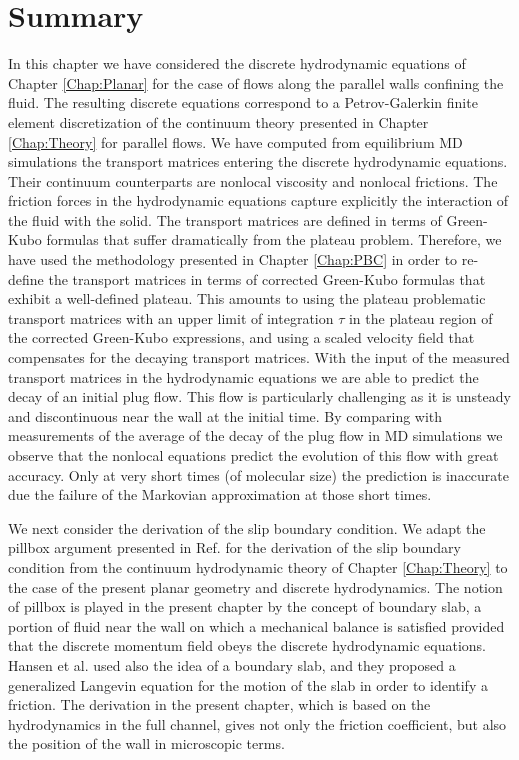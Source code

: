 \documentclass[b5paper,openright,10pt]{book}
\begin{document}
\section{Summary}

In this chapter  we have  considered the  discrete hydrodynamic
equations of  Chapter \ref{Chap:Planar} for  the case of  flows along the  parallel walls
confining the fluid. The resulting  discrete equations correspond to a
Petrov-Galerkin finite element discretization  of the continuum theory
presented in Chapter \ref{Chap:Theory} for  parallel flows.  We have computed
from equilibrium  MD simulations  the transport matrices  entering the
discrete  hydrodynamic equations.   Their  continuum counterparts  are
nonlocal viscosity  and nonlocal frictions.  The  friction forces in
the hydrodynamic  equations capture explicitly the  interaction of the
fluid with the solid.  The transport  matrices are defined in terms of
Green-Kubo formulas that suffer dramatically from the plateau problem.
Therefore, we have used the methodology presented in Chapter \ref{Chap:PBC} in
order  to  re-define the  transport  matrices  in terms  of  corrected
Green-Kubo  formulas  that  exhibit   a  well-defined  plateau.   This
amounts to using  the plateau problematic transport  matrices with an
upper  limit  of integration  $\tau$  in  the  plateau region  of  the
corrected Green-Kubo  expressions, and  using a scaled  velocity field
that compensates for the decaying  transport matrices.  With the input
of the  measured transport matrices  in the hydrodynamic  equations we
are able to predict  the decay of an initial plug  flow.  This flow is
particularly challenging as  it is unsteady and discontinuous near the  wall at the
initial time.   By comparing with  measurements of the average  of the
decay of the plug flow in MD simulations we observe that the nonlocal
equations predict the evolution of this flow with great accuracy. Only
at very short  times (of molecular size) the  prediction is inaccurate
due the failure of the Markovian approximation at those short times.

We next  consider the  derivation of the  slip boundary  condition. We
adapt  the  pillbox  argument  presented in  Ref.   \cite{CamargoBC2018}  for  the
derivation  of   the  slip  boundary  condition   from  the  continuum
hydrodynamic theory of Chapter \ref{Chap:Theory} to the case  of the present
planar geometry and  discrete hydrodynamics. The notion  of pillbox is
played in the present chapter by  the concept of boundary slab, a portion
of fluid  near the  wall on  which a  mechanical balance  is satisfied
provided  that   the  discrete  momentum  field   obeys  the  discrete
hydrodynamic equations. Hansen et  al. \cite{Hansen2011} used also the
idea  of a  boundary slab,  and they  proposed a  generalized Langevin
equation  for  the  motion  of  the   slab  in  order  to  identify  a
friction. The derivation  in the present chapter, which is  based on the
hydrodynamics  in  the  full  channel, gives  not  only  the  friction
coefficient, but also the position of the wall in microscopic terms.
\end{document}

